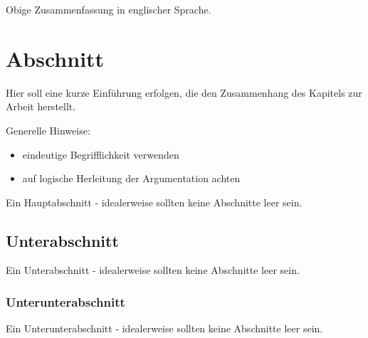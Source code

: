 Obige Zusammenfassung in englischer Sprache.

\newpage
{} %
\listoffigures

\newpage
{} %
\listoftables
\newpage

\setlength{\parskip}{0.5em} 




\clearpage
{}  
    \setcounter{page}{1}
\lhead{\nouppercase{\leftmark}}








\section{Abschnitt} 
Hier soll eine kurze Einführung erfolgen, die den Zusammenhang des Kapitels zur Arbeit herstellt.

Generelle Hinweise:

\begin{itemize}
\item eindeutige Begrifflichkeit verwenden
\item auf logische Herleitung der Argumentation achten
\end{itemize}

Ein Hauptabschnitt - idealerweise sollten keine Abschnitte leer sein.

\subsection{Unterabschnitt}
Ein Unterabschnitt - idealerweise sollten keine Abschnitte leer sein.

\subsubsection{Unterunterabschnitt}
Ein Unterunterabschnitt - idealerweise sollten keine Abschnitte leer sein.

